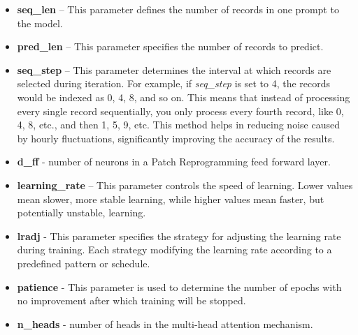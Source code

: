 \begin{itemize}
	\item \textbf{seq\_len} – This parameter defines the number of records in one prompt to the model.
	\item \textbf{pred\_len} – This parameter specifies the number of records to predict.
	\item \textbf{seq\_step} – This parameter determines the interval at which records are selected during iteration. For example, if \textit{seq\_step} is set to 4, the records would be indexed as 0, 4, 8, and so on. This means that instead of processing every single record sequentially, you only process every fourth record, like 0, 4, 8, etc., and then 1, 5, 9, etc. This method helps in reducing noise caused by hourly fluctuations, significantly improving the accuracy of the results.
	\item \textbf{d\_ff} - number of neurons in a Patch Reprogramming feed forward layer.
	\item \textbf{learning\_rate} – This parameter controls the speed of learning. Lower values mean slower, more stable learning, while higher values mean faster, but potentially unstable, learning.
	\item \textbf{lradj} - This parameter specifies the strategy for adjusting the learning rate during training. Each strategy modifying the learning rate according to a predefined pattern or schedule.
	\item \textbf{patience} - This parameter is used to determine the number of epochs with no improvement after which training will be stopped.
	\item \textbf{n\_heads} - number of heads in the multi-head attention mechanism.
\end{itemize}

